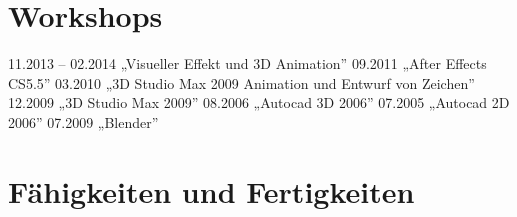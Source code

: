 \documentclass[11pt,a4paper,roman]{moderncv}
\begin{document}
\section{Workshops} 

	{11.2013 -- 02.2014 „Visueller Effekt und 3D Animation”}
		{09.2011 \hspace{15mm} „After Effects CS5.5”}
\cvline{}					{03.2010 \hspace{15mm} „3D Studio Max 2009 Animation und Entwurf von Zeichen”}
\cvline{}					{12.2009 \hspace{15mm} „3D Studio Max 2009”}
\cvline{}					{08.2006 \hspace{15mm} „Autocad 3D 2006”}
\cvline{}					{07.2005 \hspace{15mm} „Autocad 2D 2006”}
				{07.2009 \hspace{15mm} „Blender”}

\section{Fähigkeiten und Fertigkeiten} 






\end{document}
